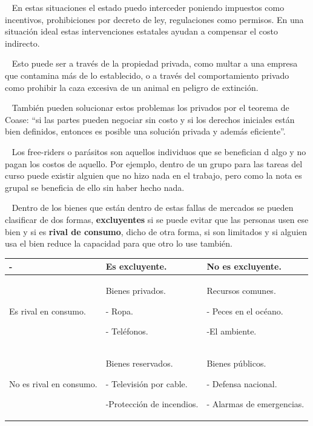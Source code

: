 \documentclass[
  letterpaper,
  DIV=11,
  numbers=noendperiod]{scrreport}
\begin{document}
~ En estas situaciones el estado puedo interceder poniendo impuestos
como incentivos, prohibiciones por decreto de ley, regulaciones como
permisos. En una situación ideal estas intervenciones estatales ayudan a
compensar el costo indirecto.

~ Esto puede ser a través de la propiedad privada, como multar a una
empresa que contamina más de lo establecido, o a través del
comportamiento privado como prohibir la caza excesiva de un animal en
peligro de extinción.

~ También pueden solucionar estos problemas los privados por el teorema
de Coase: ``si las partes pueden negociar sin costo y si los derechos
iniciales están bien definidos, entonces es posible una solución privada
y además eficiente''.

~ Los free-riders o parásitos son aquellos individuos que se benefician
d algo y no pagan los costos de aquello. Por ejemplo, dentro de un grupo
para las tareas del curso puede existir alguien que no hizo nada en el
trabajo, pero como la nota es grupal se beneficia de ello sin haber
hecho nada.

~ Dentro de los bienes que están dentro de estas fallas de mercados se
pueden clasificar de dos formas, \textbf{excluyentes} si se puede evitar
que las personas usen ese bien y si es \textbf{rival de consumo}, dicho
de otra forma, si son limitados y si alguien usa el bien reduce la
capacidad para que otro lo use también.

\begin{table}[h]
    \centering
    \begin{tabular}{|p{30mm}|p{30mm}|p{30mm}|}
        \hline
        - & Es excluyente. & No es excluyente. \\ \hline
        Es rival en consumo. & Bienes privados. \par - Ropa. \par - Teléfonos. & Recursos comunes. \par - Peces en el océano. \par -El ambiente. \\ \hline
        No es rival en consumo. & Bienes reservados. \par - Televisión por cable. \par -Protección de incendios. \par & Bienes públicos. \par - Defensa nacional. \par - Alarmas de emergencias. \\ \hline
    \end{tabular}
    
\end{table}
\end{document}
